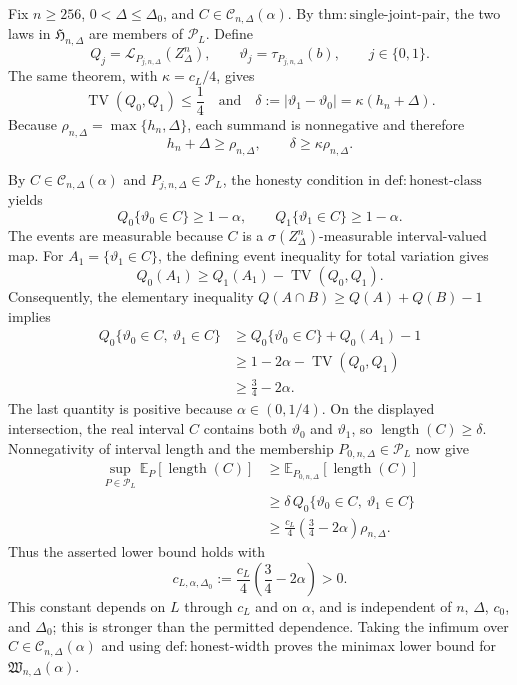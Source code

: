 Fix \(n\geq256\), \(0<\Delta\leq\Delta_0\), and \(C\in\mathcal C_{n,\Delta}(\alpha)\).  By \(\mathrm{thm:single\text{-}joint\text{-}pair}\), the two laws in \(\mathfrak H_{n,\Delta}\) are members of \(\mathcal P_L\).  Define
\[
 Q_j=\mathcal L_{P_{j,n,\Delta}}(Z_\Delta^n),
 \qquad
 \vartheta_j=\tau_{P_{j,n,\Delta}}(b),
 \qquad j\in\{0,1\}.
\]
The same theorem, with \(\kappa=c_L/4\), gives
\[
 \operatorname{TV}(Q_0,Q_1)\leq\frac14
 \quad\text{and}\quad
 \delta:=|\vartheta_1-\vartheta_0|
 =\kappa(h_n+\Delta).
\]
Because \(\rho_{n,\Delta}=\max\{h_n,\Delta\}\), each summand is nonnegative and therefore
\[
 h_n+\Delta\geq\rho_{n,\Delta},
 \qquad
 \delta\geq\kappa\rho_{n,\Delta}.
\]

By \(C\in\mathcal C_{n,\Delta}(\alpha)\) and \(P_{j,n,\Delta}\in\mathcal P_L\), the honesty condition in \(\mathrm{def:honest\text{-}class}\) yields
\[
 Q_0\{\vartheta_0\in C\}\geq1-\alpha,
 \qquad
 Q_1\{\vartheta_1\in C\}\geq1-\alpha.
\]
The events are measurable because \(C\) is a \(\sigma(Z_\Delta^n)\)-measurable interval-valued map.  For \(A_1=\{\vartheta_1\in C\}\), the defining event inequality for total variation gives
\[
 Q_0(A_1)\geq Q_1(A_1)-\operatorname{TV}(Q_0,Q_1).
\]
Consequently, the elementary inequality \(Q(A\cap B)\geq Q(A)+Q(B)-1\) implies
\[
 \begin{aligned}
 Q_0\{\vartheta_0\in C,\ \vartheta_1\in C\}
 &\geq Q_0\{\vartheta_0\in C\}+Q_0(A_1)-1\\
 &\geq1-2\alpha-\operatorname{TV}(Q_0,Q_1)\\
 &\geq\frac34-2\alpha.
 \end{aligned}
\]
The last quantity is positive because \(\alpha\in(0,1/4)\).  On the displayed intersection, the real interval \(C\) contains both \(\vartheta_0\) and \(\vartheta_1\), so \(\operatorname{length}(C)\geq\delta\).  Nonnegativity of interval length and the membership \(P_{0,n,\Delta}\in\mathcal P_L\) now give
\[
 \begin{aligned}
 \sup_{P\in\mathcal P_L}\mathbb E_P[\operatorname{length}(C)]
 &\geq \mathbb E_{P_{0,n,\Delta}}[\operatorname{length}(C)]\\
 &\geq \delta\,Q_0\{\vartheta_0\in C,\ \vartheta_1\in C\}\\
 &\geq \frac{c_L}{4}\left(\frac34-2\alpha\right)\rho_{n,\Delta}.
 \end{aligned}
\]
Thus the asserted lower bound holds with
\[
 c_{L,\alpha,\Delta_0}
 :=\frac{c_L}{4}\left(\frac34-2\alpha\right)>0.
\]
This constant depends on \(L\) through \(c_L\) and on \(\alpha\), and is independent of \(n\), \(\Delta\), \(c_0\), and \(\Delta_0\); this is stronger than the permitted dependence.  Taking the infimum over \(C\in\mathcal C_{n,\Delta}(\alpha)\) and using \(\mathrm{def:honest\text{-}width}\) proves the minimax lower bound for \(\mathfrak W_{n,\Delta}(\alpha)\).

